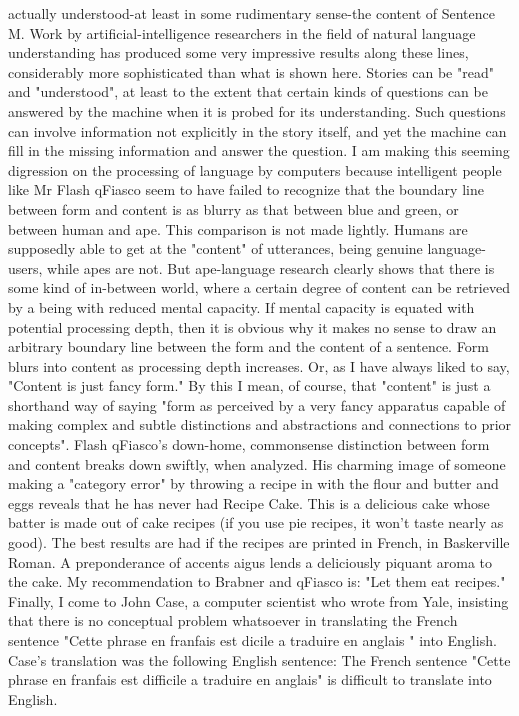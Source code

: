 actually understood-at least in some rudimentary sense-the content of Sentence M. Work by artificial-intelligence researchers in the field of natural language understanding has produced some very impressive results along these lines, considerably more sophisticated than what is shown here. Stories can be "read" and "understood", at least to the extent that certain kinds of questions can be answered by the machine when it is probed for its understanding. Such questions can involve information not explicitly in the story itself, and yet the machine can fill in the missing information and answer the question. I am making this seeming digression on the processing of language by computers because intelligent people like Mr Flash qFiasco seem to have failed to recognize that the boundary line between form and content is as blurry as that between blue and green, or between human and ape. This comparison is not made lightly. Humans are supposedly able to get at the "content" of utterances, being genuine language-users, while apes are not. But ape-language research clearly shows that there is some kind of in-between world, where a certain degree of content can be retrieved by a being with reduced mental capacity. If mental capacity is equated with potential processing depth, then it is obvious why it makes no sense to draw an arbitrary boundary line between the form and the content of a sentence. Form blurs into content as processing depth increases. Or, as I have always liked to say, "Content is just fancy form." By this I mean, of course, that "content" is just a shorthand way of saying "form as perceived by a very fancy apparatus capable of making complex and subtle distinctions and abstractions and connections to prior concepts". Flash qFiasco's down-home, commonsense distinction between form and content breaks down swiftly, when analyzed. His charming image of someone making a "category error" by throwing a recipe in with the flour and butter and eggs reveals that he has never had Recipe Cake. This is a delicious cake whose batter is made out of cake recipes (if you use pie recipes, it won't taste nearly as good). The best results are had if the recipes are printed in French, in Baskerville Roman. A preponderance of accents aigus lends a deliciously piquant aroma to the cake. My recommendation to Brabner and qFiasco is: "Let them eat recipes." 
\separator
Finally, I come to John Case, a computer scientist who wrote from Yale, insisting that there is no conceptual problem whatsoever in translating the French sentence "Cette phrase en franfais est dicile a traduire en anglais " into English. Case's translation was the following English sentence: 
The French sentence "Cette phrase en franfais est difficile a traduire en anglais" is difficult to translate into English. 



